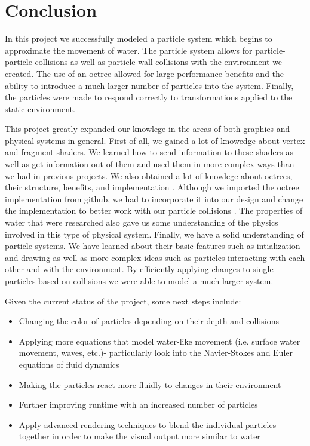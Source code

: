 \section{Conclusion}



In this project we successfully modeled a particle system which begins to approximate the
movement of water.  The particle system allows for particle-particle collisions as well 
as particle-wall collisions with the environment we created.  The use of an octree
allowed for large performance benefits and the ability to introduce a much larger number 
of particles into the system.  Finally, the particles were made to respond correctly to 
transformations applied to the static environment.

This project greatly expanded our knowlege in the areas of both graphics and physical 
systems in general. First of all, we gained a lot of knowedge about vertex and fragment
shaders.  We learned how to send information to these shaders as well as get information
out of them and used them in more complex ways than we had in previous projects.  We also
obtained a lot of knowlege about octrees, their structure, benefits, and implementation
.  Although we imported the octree implementation from github, we had to incorporate it
into our design and change the implementation to better work with our particle collisions
. The properties of water that were researched also gave us some understanding of the
physics involved in this type of physical system.  Finally, we have a solid understanding
of particle systems.  We have learned about their basic features such as intialization
and drawing as well as more complex ideas such as particles interacting with each other
and with the environment.  By efficiently applying changes to single particles based on
collisions we were able to model a much larger system.

Given the current status of the project, some next steps include:
\begin{itemize}
  \item{Changing the color of particles depending on their depth and collisions}
  \item{Applying more equations that model water-like movement (i.e. surface water movement,
    waves, etc.)- particularly look into the Navier-Stokes and Euler equations of fluid dynamics}
  \item{Making the particles react more fluidly to changes in their environment}
  \item{Further improving runtime with an increased number of particles}
  \item{Apply advanced rendering techniques to blend the individual particles together in order to make the visual output more similar to water}
\end{itemize}

